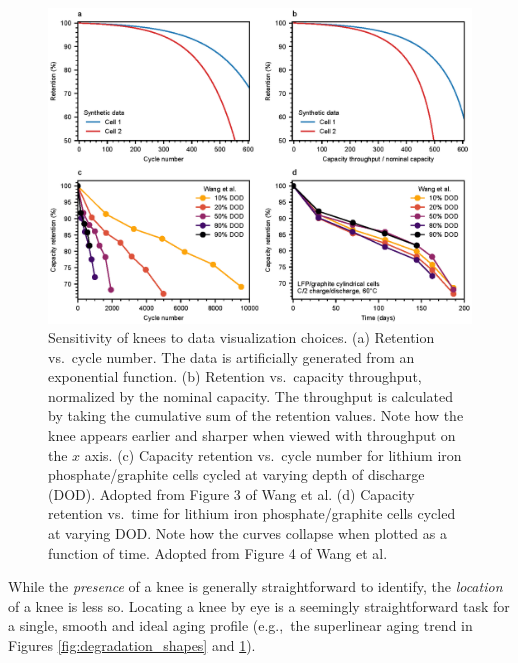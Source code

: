 \documentclass[journal=jpclcd,manuscript=article]{achemso}
\begin{document}
\begin{figure}[!ht]
\centering
\includegraphics[scale=1]{figures/x_axis_sensitivity.eps}
\caption{Sensitivity of knees to data visualization choices.
(a) Retention vs.~cycle number. The data is artificially generated from an exponential function. 
(b) Retention vs.~capacity throughput, normalized by the nominal capacity. The throughput is calculated by taking the cumulative sum of the retention values.
Note how the knee appears earlier and sharper when viewed with throughput on the $x$ axis.
(c) Capacity retention vs.~cycle number for lithium iron phosphate/graphite cells cycled at varying depth of discharge (DOD). Adopted from Figure 3 of Wang et al.\cite{wang_cycle-life_2011}
(d) Capacity retention vs.~time for lithium iron phosphate/graphite cells cycled at varying DOD.
Note how the curves collapse when plotted as a function of time.
Adopted from Figure 4 of Wang et al.\cite{wang_cycle-life_2011}
}
\label{fig:x_axis}
\end{figure}

While the \textit{presence} of a knee is generally straightforward to identify, the \textit{location} of a knee is less so.
Locating a knee by eye is a seemingly straightforward task for a single, smooth and ideal aging profile (e.g.,~the superlinear aging trend in Figures \ref{fig:degradation_shapes} and \ref{fig:x_axis}). 
\end{document}
